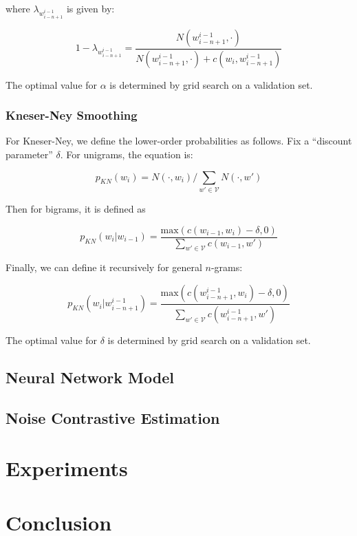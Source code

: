 \documentclass[11pt]{article}
\begin{document}
where $\lambda_{w^{i-1}_{i-n+1}}$ is given by:

$$1 - \lambda_{w^{i-1}_{i-n+1}} = \frac{N(w^{i-1}_{i-n+1}, \cdot)}{N(w^{i-1}_{i-n+1}, \cdot) + c(w_i, w^{i-1}_{i-n+1})}$$ 

The optimal value for $\alpha$ is determined by grid search on a validation set. 

\subsubsection{Kneser-Ney Smoothing}

For Kneser-Ney, we define the lower-order probabilities as follows. Fix a ``discount parameter'' $\delta$. For unigrams, the equation is:

$$p_{KN}(w_i) = N(\cdot, w_i)/\sum_{w' \in \mathcal{V}} N(\cdot, w')$$

Then for bigrams, it is defined as 

$$p_{KN}(w_i | w_{i-1}) = \frac{\text{max}(c(w_{i-1}, w_i) - \delta, 0)}{\sum_{w' \in \mathcal{V}} c(w_{i-1}, w')}$$

Finally, we can define it recursively for general $n$-grams:

$$p_{KN}(w_i | w^{i-1}_{i-n+1}) = \frac{\text{max}(c(w^{i-1}_{i-n+1}, w_i) - \delta, 0)}{\sum_{w' \in \mathcal{V}}c(w^{i-1}_{i-n+1}, w')}$$

The optimal value for $\delta$ is determined by grid search on a validation set. 

\subsection{Neural Network Model}

\subsection{Noise Contrastive Estimation}

\section{Experiments}

\section{Conclusion}




\end{document}
